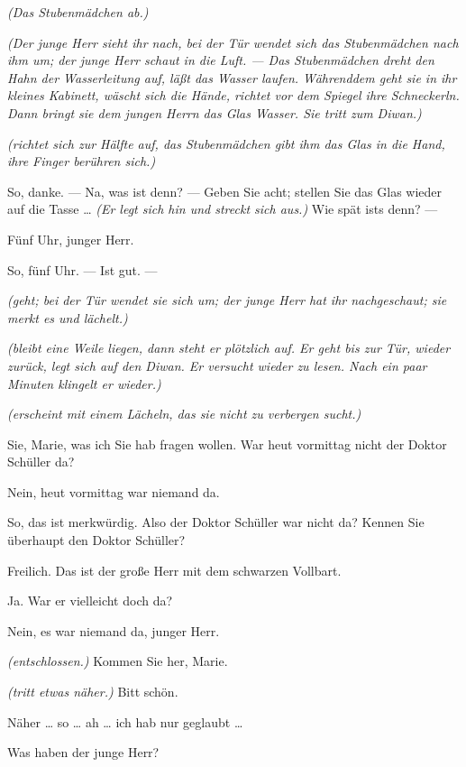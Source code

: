 \documentclass[
	final,
	a4paper,
	ngerman,
	mpinclude = true, %
	twoside = true,
	open = right,
	cleardoublepage = plain,
	DIV = 13,
	BCOR = 1cm,
	titlepage = firstiscover,
	]{scrbook}
\newcommand{\direction}[1]{\textit{(#1)}}
\newcommand{\thecharacter}[1]{\textup{\textsc{#1}}\xspace}
\newcommand{\themaedchen}{\thecharacter{Praktikant}}
\newcommand{\theherr}{\thecharacter{Junger Herr}}
\newcommand{\character}[1]{\item[#1:]}
\newcommand{\maedchen}{\character{\themaedchen}}
\newcommand{\herr}{\character{\theherr}}
\begin{document}
\begin{play}
	\direction{Das Stubenmädchen ab.}

	\direction{Der junge Herr sieht ihr nach, bei der Tür wendet sich das Stubenmädchen nach ihm um; der junge Herr schaut in die Luft. --- Das Stubenmädchen dreht den Hahn der Wasserleitung auf, läßt das Wasser laufen. Währenddem geht sie in ihr kleines Kabinett, wäscht sich die Hände, richtet vor dem Spiegel ihre Schneckerln. Dann bringt sie dem jungen Herrn das Glas Wasser. Sie tritt zum Diwan.}

	\herr
	\direction{richtet sich zur Hälfte auf, das Stubenmädchen gibt ihm das Glas in die Hand, ihre Finger berühren sich.}

	\herr
	So, danke. --- Na, was ist denn? --- Geben Sie acht; stellen Sie das Glas wieder auf die Tasse \ldots{} \direction{Er legt sich hin und streckt sich aus.} Wie spät ists denn? ---

	\maedchen
	Fünf Uhr, junger Herr.

	\herr
	So, fünf Uhr. --- Ist gut. ---

	\maedchen
	\direction{geht; bei der Tür wendet sie sich um; der junge Herr hat ihr nachgeschaut; sie merkt es und lächelt.}

	\herr
	\direction{bleibt eine Weile liegen, dann steht er plötzlich auf. Er geht bis zur Tür, wieder zurück, legt sich auf den Diwan. Er versucht wieder zu lesen. Nach ein paar Minuten klingelt er wieder.}

	\maedchen
	\direction{erscheint mit einem Lächeln, das sie nicht zu verbergen sucht.}

	\herr
	Sie, Marie, was ich Sie hab fragen wollen. War heut vormittag nicht der Doktor Schüller da?

	\maedchen
	Nein, heut vormittag war niemand da.

	\herr
	So, das ist merkwürdig. Also der Doktor Schüller war nicht da? Kennen Sie überhaupt den Doktor Schüller?

	\maedchen
	Freilich. Das ist der große Herr mit dem schwarzen Vollbart.

	\herr
	Ja. War er vielleicht doch da?

	\maedchen
	Nein, es war niemand da, junger Herr.

	\herr
	\direction{entschlossen.} Kommen Sie her, Marie.

	\maedchen
	\direction{tritt etwas näher.} Bitt schön.

	\herr
	Näher \ldots{} so \ldots{} ah \ldots{} ich hab nur geglaubt \ldots{}

	\maedchen
	Was haben der junge Herr?


\end{play}
\end{document}
